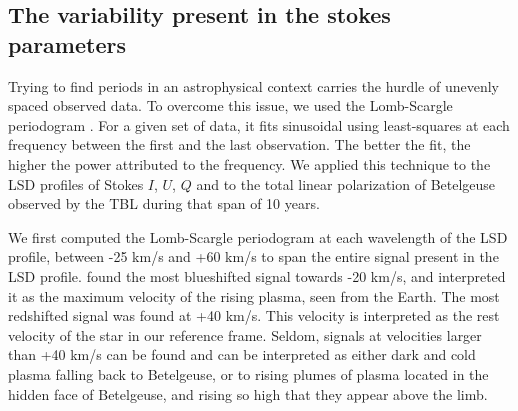 \documentclass{aa}
\begin{document}

\subsection{The variability present in the stokes parameters}


Trying to find periods in an astrophysical context carries the hurdle of unevenly spaced observed data. To overcome this issue, 
we used the Lomb-Scargle periodogram \citep{lomb_least-squares_1976,scargle_studies_1982}. For a given set of data, it fits sinusoidal 
using least-squares at each frequency between the first and the last observation. The better the fit, the higher the power attributed to the frequency. 
We applied this technique to the  LSD profiles of Stokes $I$, $U$, $Q$ and to the total linear polarization of Betelgeuse observed by the TBL during 
that span of 10 years. 


We first computed the Lomb-Scargle periodogram at each wavelength of the LSD profile, between -25 km/s and +60 km/s to span the entire 
signal present in the LSD profile. \cite{lopez_ariste_convective_2018} found the most blueshifted signal towards -20 km/s, 
and interpreted it as  the maximum velocity of the rising plasma, seen from the Earth. The most redshifted signal was found at +40 km/s. 
This velocity is interpreted
as the rest velocity of the star in our reference frame. Seldom, signals at velocities larger than +40 km/s can be found 
and can be interpreted as either dark and cold plasma falling back to Betelgeuse, 
or to rising plumes of plasma located in the hidden face of Betelgeuse,
and rising so high that they appear above the limb.





\end{document}
